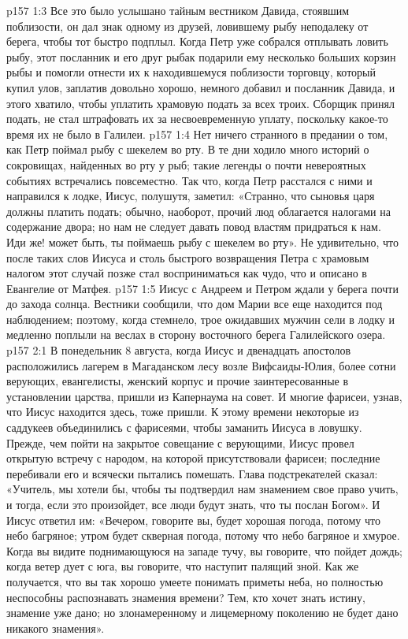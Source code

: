 \vs p157 1:3 Все это было услышано тайным вестником Давида, стоявшим поблизости, он дал знак одному из друзей, ловившему рыбу неподалеку от берега, чтобы тот быстро подплыл. Когда Петр уже собрался отплывать ловить рыбу, этот посланник и его друг рыбак подарили ему несколько больших корзин рыбы и помогли отнести их к находившемуся поблизости торговцу, который купил улов, заплатив довольно хорошо, немного добавил и посланник Давида, и этого хватило, чтобы уплатить храмовую подать за всех троих. Сборщик принял подать, не стал штрафовать их за несвоевременную уплату, поскольку какое\hyp{}то время их не было в Галилеи.
\vs p157 1:4 Нет ничего странного в предании о том, как Петр поймал рыбу с шекелем во рту. В те дни ходило много историй о сокровищах, найденных во рту у рыб; такие легенды о почти невероятных событиях встречались повсеместно. Так что, когда Петр расстался с ними и направился к лодке, Иисус, полушутя, заметил: «Странно, что сыновья царя должны платить подать; обычно, наоборот, прочий люд облагается налогами на содержание двора; но нам не следует давать повод властям придраться к нам. Иди же! может быть, ты поймаешь рыбу с шекелем во рту». Не удивительно, что после таких слов Иисуса и столь быстрого возвращения Петра с храмовым налогом этот случай позже стал восприниматься как чудо, что и описано в Евангелие от Матфея.
\vs p157 1:5 Иисус с Андреем и Петром ждали у берега почти до захода солнца. Вестники сообщили, что дом Марии все еще находится под наблюдением; поэтому, когда стемнело, трое ожидавших мужчин сели в лодку и медленно поплыли на веслах в сторону восточного берега Галилейского озера.
\vs p157 2:1 В понедельник 8 августа, когда Иисус и двенадцать апостолов расположились лагерем в Магаданском лесу возле Вифсаиды\hyp{}Юлия, более сотни верующих, евангелисты, женский корпус и прочие заинтересованные в установлении царства, пришли из Капернаума на совет. И многие фарисеи, узнав, что Иисус находится здесь, тоже пришли. К этому времени некоторые из саддукеев объединились с фарисеями, чтобы заманить Иисуса в ловушку. Прежде, чем пойти на закрытое совещание с верующими, Иисус провел открытую встречу с народом, на которой присутствовали фарисеи; последние перебивали его и всячески пытались помешать. Глава подстрекателей сказал: «Учитель, мы хотели бы, чтобы ты подтвердил нам знамением свое право учить, и тогда, если это произойдет, все люди будут знать, что ты послан Богом». И Иисус ответил им: «Вечером, говорите вы, будет хорошая погода, потому что небо багряное; утром будет скверная погода, потому что небо багряное и хмурое. Когда вы видите поднимающуюся на западе тучу, вы говорите, что пойдет дождь; когда ветер дует с юга, вы говорите, что наступит палящий зной. Как же получается, что вы так хорошо умеете понимать приметы неба, но полностью неспособны распознавать знамения времени? Тем, кто хочет знать истину, знамение уже дано; но злонамеренному и лицемерному поколению не будет дано никакого знамения».
